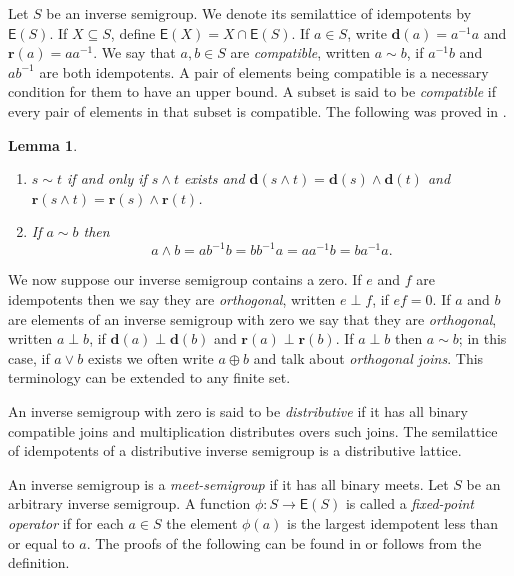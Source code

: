 \documentclass[a4paper]{amsart}
\newtheorem{lemma}[theorem]{Lemma}
\newcommand{\dom}{\mathbf{d}}
\newcommand{\ran}{\mathbf{r}}
\begin{document}
Let $S$ be an inverse semigroup.
We denote its semilattice of idempotents by $\mathsf{E}(S)$.
If $X \subseteq S$, define $\mathsf{E}(X) = X \cap \mathsf{E}(S)$.
If $a \in S$, write $\mathbf{d}(a) = a^{-1}a$ and $\mathbf{r}(a) = aa^{-1}$.
We say that $a,b \in S$ are {\em compatible}, written $a \sim b$, if $a^{-1}b$ and $ab^{-1}$ are both idempotents.
A pair of elements being compatible is a necessary condition for them to have an upper bound.
A subset is said to be {\em compatible} if every pair of elements in that subset is compatible.
The following was proved in \cite[Lemma 1.4.11, Lemma 1.4.12]{Lawson1998}.

\begin{lemma}\label{lem:buffs1}\mbox{}
\begin{enumerate} 

\item $s \sim t$ if and only if $s \wedge t$ exists and 
$\dom (s \wedge t) = \dom (s) \wedge \dom (t)$
and
$\ran (s \wedge t) = \ran (s) \wedge \ran (t)$.

\item If $a \sim b$ then
$$a \wedge b = ab^{-1}b = bb^{-1}a = aa^{-1}b = ba^{-1}a.$$

\end{enumerate}
\end{lemma}

We now suppose our inverse semigroup contains a zero.
If $e$ and $f$ are idempotents then we say they are {\em orthogonal}, written $e \perp f$, if $ef = 0$.
If $a$ and $b$ are elements of an inverse semigroup with zero we say that they are {\em orthogonal},
written $a \perp b$, if $\mathbf{d}(a) \perp \mathbf{d}(b)$ and $\mathbf{r}(a) \perp \mathbf{r}(b)$.
If $a \perp b$ then $a \sim b$;
in this case, if $a \vee b$ exists we often write $a \oplus b$ and talk about {\em orthogonal joins}.
This terminology can be extended to any finite set.

An inverse semigroup with zero is said to be {\em distributive} if it has all binary compatible joins
and multiplication distributes overs such joins.
The semilattice of idempotents of a distributive inverse semigroup
is a distributive lattice.

An inverse semigroup is a {\em meet-semigroup} if it has all binary meets.
Let $S$ be an arbitrary inverse semigroup.
A function $\phi \colon S \rightarrow \mathsf{E}(S)$ is called a 
{\em fixed-point operator} if for each $a \in S$ the element $\phi (a)$ is the largest
idempotent less than or equal to $a$.
The proofs of the following can be found in \cite{Leech} or follows from the definition.
\end{document}
